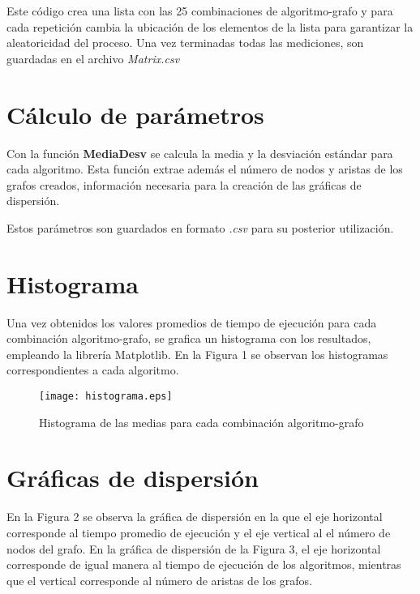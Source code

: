 \documentclass{article}
\begin{document}
 

Este código crea una lista con las 25 combinaciones de algoritmo-grafo y para cada repetición cambia la ubicación de los elementos de la lista para garantizar la aleatoricidad del proceso. Una vez terminadas todas las mediciones, son guardadas en el archivo \textit{Matrix.csv}

\section*{Cálculo de parámetros}

Con la función \textbf{MediaDesv} se calcula la media y la desviación estándar para cada algoritmo. Esta función extrae además el número de nodos y aristas de los grafos creados, información necesaria para la creación de las gráficas de dispersión.

 

Estos parámetros son guardados en formato \textit{.csv} para su posterior utilización.


\section*{Histograma}

Una vez obtenidos los valores promedios de tiempo de ejecución para cada combinación algoritmo-grafo, se grafica un histograma con los resultados, empleando la librería Matplotlib\cite{matplotlib}. En la Figura 1 se observan los histogramas correspondientes a cada algoritmo.
\begin{figure}
\begin{center}
  \texttt{[image: histograma.eps]}
\end{center}
\vspace*{-18mm}
\caption{Histograma de las medias para cada combinación algoritmo-grafo}
  \label{Figura 1} 
\end{figure}


\section*{Gráficas de dispersión}

En la Figura 2 se observa la gráfica de dispersión en la que el eje horizontal corresponde al tiempo promedio de ejecución y el eje vertical al el número de nodos del grafo. En la gráfica de dispersión de la Figura 3, el eje horizontal corresponde de igual manera al tiempo de ejecución de los algoritmos, mientras que el vertical corresponde al número de aristas de los grafos. 
\end{document}

